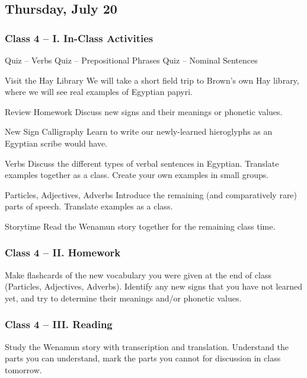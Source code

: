 \documentclass[11pt]{article}
\begin{document}
	\subsection*{Thursday, July 20}
		\subsubsection*{Class 4 -- I. In-Class Activities}
			\begin{outline}[itemize]
				\1 Quiz -- Verbs
				\1 Quiz -- Prepositional Phrases
				\1 Quiz -- Nominal Sentences
				
				\1 Visit the Hay Library
					\2 We will take a short field trip to Brown's own Hay library, 
						where we will see real examples of Egyptian papyri.
				
				\1 Review Homework
					\2 Discuss new signs and their meanings or phonetic values.
				
				\1 New Sign Calligraphy
					\2 Learn to write our newly-learned hieroglyphs as an Egyptian scribe would have.
					
				\1 Verbs
					\2 Discuss the different types of verbal sentences in Egyptian.
					\2 Translate examples together as a class.
					\2 Create your own examples in small groups.
				
				\1 Particles, Adjectives, Adverbs
					\2 Introduce the remaining (and comparatively rare) parts of speech.
					\2 Translate examples as a class.
					
				\1 Storytime
					\2 Read the Wenamun story together for the remaining class time.
				
				
			\end{outline}
			
		\subsubsection*{Class 4 -- II. Homework}
			Make flashcards of the new vocabulary you were given at the end of class (Particles, Adjectives, Adverbs).
			Identify any new signs that you have not learned yet, and try to determine their meanings and/or phonetic values.
			
		\subsubsection*{Class 4 -- III. Reading}
			Study the Wenamun story with transcription and translation.
			Understand the parts you can understand, mark the parts you cannot for discussion in class tomorrow.
			
\end{document}

